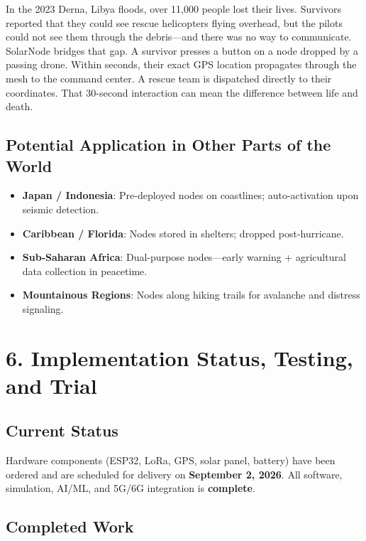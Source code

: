 \documentclass[12pt,a4paper]{article}
\begin{document}
In the 2023 Derna, Libya floods, over 11,000 people lost their lives. Survivors reported that they could see rescue helicopters flying overhead, but the pilots could not see them through the debris—and there was no way to communicate. SolarNode bridges that gap. A survivor presses a button on a node dropped by a passing drone. Within seconds, their exact GPS location propagates through the mesh to the command center. A rescue team is dispatched directly to their coordinates. That 30-second interaction can mean the difference between life and death.

\subsection*{Potential Application in Other Parts of the World}

\begin{itemize}
    \item \textbf{Japan / Indonesia}: Pre-deployed nodes on coastlines; auto-activation upon seismic detection.
    \item \textbf{Caribbean / Florida}: Nodes stored in shelters; dropped post-hurricane.
    \item \textbf{Sub-Saharan Africa}: Dual-purpose nodes—early warning + agricultural data collection in peacetime.
    \item \textbf{Mountainous Regions}: Nodes along hiking trails for avalanche and distress signaling.
\end{itemize}

\section*{6. Implementation Status, Testing, and Trial}

\subsection*{Current Status}

Hardware components (ESP32, LoRa, GPS, solar panel, battery) have been ordered and are scheduled for delivery on \textbf{September 2, 2026}. All software, simulation, AI/ML, and 5G/6G integration is \textbf{complete}.

\subsection*{Completed Work}
\end{document}
